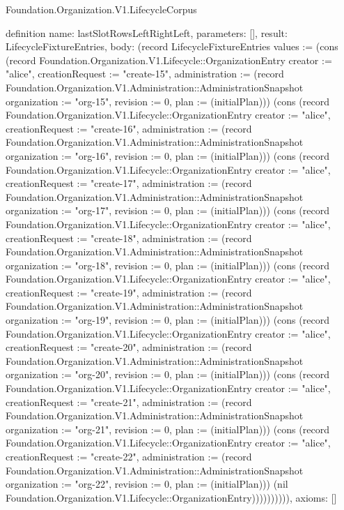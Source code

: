 \begin{lexlean}{Foundation.Organization.V1.LifecycleCorpus}
\begin{semanticmodule}
definition{
  name: lastSlotRowsLeftRightLeft,
  parameters: [],
  result: LifecycleFixtureEntries,
  body: (record LifecycleFixtureEntries {values := (cons (record Foundation.Organization.V1.Lifecycle::OrganizationEntry {creator := "alice", creationRequest := "create-15", administration := (record Foundation.Organization.V1.Administration::AdministrationSnapshot {organization := "org-15", revision := 0, plan := (initialPlan)})}) (cons (record Foundation.Organization.V1.Lifecycle::OrganizationEntry {creator := "alice", creationRequest := "create-16", administration := (record Foundation.Organization.V1.Administration::AdministrationSnapshot {organization := "org-16", revision := 0, plan := (initialPlan)})}) (cons (record Foundation.Organization.V1.Lifecycle::OrganizationEntry {creator := "alice", creationRequest := "create-17", administration := (record Foundation.Organization.V1.Administration::AdministrationSnapshot {organization := "org-17", revision := 0, plan := (initialPlan)})}) (cons (record Foundation.Organization.V1.Lifecycle::OrganizationEntry {creator := "alice", creationRequest := "create-18", administration := (record Foundation.Organization.V1.Administration::AdministrationSnapshot {organization := "org-18", revision := 0, plan := (initialPlan)})}) (cons (record Foundation.Organization.V1.Lifecycle::OrganizationEntry {creator := "alice", creationRequest := "create-19", administration := (record Foundation.Organization.V1.Administration::AdministrationSnapshot {organization := "org-19", revision := 0, plan := (initialPlan)})}) (cons (record Foundation.Organization.V1.Lifecycle::OrganizationEntry {creator := "alice", creationRequest := "create-20", administration := (record Foundation.Organization.V1.Administration::AdministrationSnapshot {organization := "org-20", revision := 0, plan := (initialPlan)})}) (cons (record Foundation.Organization.V1.Lifecycle::OrganizationEntry {creator := "alice", creationRequest := "create-21", administration := (record Foundation.Organization.V1.Administration::AdministrationSnapshot {organization := "org-21", revision := 0, plan := (initialPlan)})}) (cons (record Foundation.Organization.V1.Lifecycle::OrganizationEntry {creator := "alice", creationRequest := "create-22", administration := (record Foundation.Organization.V1.Administration::AdministrationSnapshot {organization := "org-22", revision := 0, plan := (initialPlan)})}) (nil Foundation.Organization.V1.Lifecycle::OrganizationEntry)))))))))}),
  axioms: []
}


\end{semanticmodule}
\end{lexlean}
